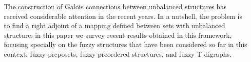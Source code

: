 
The construction of Galois connections between unbalanced structures has received considerable attention in the recent years. 
In a nutshell, the problem is to find a right adjoint of a mapping defined between sets with unbalanced structure; in this paper we survey recent results obtained in this framework, focusing specially on    the fuzzy structures that have been considered so far in this context:
   fuzzy preposets, fuzzy preordered structures,      and fuzzy T-digraphs.
 
